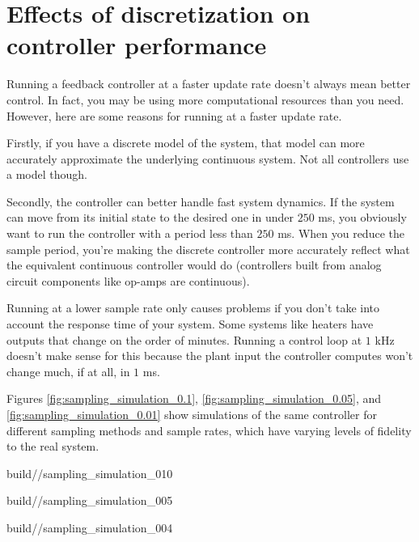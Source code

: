 \section{Effects of discretization on controller performance}

Running a feedback controller at a faster update rate doesn't always mean better
control. In fact, you may be using more computational resources than you need.
However, here are some reasons for running at a faster update rate.

Firstly, if you have a discrete \gls{model} of the \gls{system}, that
\gls{model} can more accurately approximate the underlying continuous
\gls{system}. Not all controllers use a \gls{model} though.

Secondly, the controller can better handle fast \gls{system} dynamics. If the
\gls{system} can move from its initial state to the desired one in under $250$
ms, you obviously want to run the controller with a period less than $250$ ms.
When you reduce the sample period, you're making the discrete controller more
accurately reflect what the equivalent continuous controller would do
(controllers built from analog circuit components like op-amps are continuous).

Running at a lower sample rate only causes problems if you don't take into
account the response time of your \gls{system}. Some \glspl{system} like heaters
have \glspl{output} that change on the order of minutes. Running a control loop
at $1$ kHz doesn't make sense for this because the \gls{plant} \gls{input} the
controller computes won't change much, if at all, in $1$ ms.

Figures \ref{fig:sampling_simulation_0.1}, \ref{fig:sampling_simulation_0.05},
and \ref{fig:sampling_simulation_0.01} show simulations of the same controller
for different sampling methods and sample rates, which have varying levels of
fidelity to the real \gls{system}.
\begin{bookfigure}
  \begin{minisvg}{2}{build/\chapterpath/sampling_simulation_010}
    \caption{Sampling methods for system simulation with $T = 0.1$ s}
    \label{fig:sampling_simulation_0.1}
  \end{minisvg}
  \hfill
  \begin{minisvg}{2}{build/\chapterpath/sampling_simulation_005}
    \caption{Sampling methods for system simulation with $T = 0.05$ s}
    \label{fig:sampling_simulation_0.05}
  \end{minisvg}
  \hfill
  \begin{minisvg}{2}{build/\chapterpath/sampling_simulation_004}
    \caption{Sampling methods for system simulation with $T = 0.01$ s}
    \label{fig:sampling_simulation_0.01}
  \end{minisvg}
\end{bookfigure}

